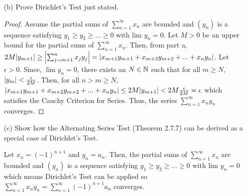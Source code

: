 \documentclass[12pt,letterpaper]{article}
\begin{document}
\begin{itemize}[leftmargin=!,labelindent=5pt]
\begin{itemize}
\begin{proof}
\begin{align*}
                        \abs{\sum_{j={m+1}}^n x_jy_j} &= \abs{s_ny_{n+1} - s_my_{m+1} + \sum_{j=m+1}^n s_j(y_j - y_{j+1})}\\
                        &\leq \abs{s_ny_{n+1} - s_my_{m+1}} + \abs{\sum_{j=m+1}^n s_j(y_j - y_{j+1})}\\
                        &\leq s_ny_{n+1} + s_my_{m+1} + \sum_{j=m+1}^n s_j(y_j - y_{j+1})\\
                        &\leq My_{n+1} + My_{m+1} + \sum_{j=m+1}^n M(y_j - y_{j+1})\\
                        &\leq My_{n+1} + My_{m+1} + M(y_{m+1} - y_{n+1})\\
                        &= 2My_{m+1}
                    \end{align*}
                    So, $\abs{\sum_{j=m+1}^{n} x_j y_j} \leq 2M \abs{y_{m+1}}$ as desired.
                \end{proof}
            \item [(b)] Prove Dirichlet’s Test just stated.
                \begin{proof}
                    Assume the partial sums of $\sum_{n=1}^{\infty} x_n$ are bounded and $(y_n)$ is a sequence satisfying $y_1 \geq y_2 \geq ... \geq 0$ with lim $y_n = 0$.
                    Let $M > 0$ be an upper bound for the partial sums of $\sum_{n=1}^{\infty}x_n$.
                    Then, from part a, $2M \abs{y_{m+1}} \geq \abs{\sum_{j=m+1}^{n} x_j y_j} = \abs{x_{m+1} y_{m+1} + x_{m+2} y_{m+2} + ... + x_{n} y_{n}}$.
                    Let $\epsilon > 0$.
                    Since, $\lim y_n = 0$, there exists an $N \in \mathbb{N}$ such that for all $m \geq N$, $\abs{y_m} < \frac{\epsilon}{2M}$.
                    Then, for all $n > m \geq N$, $\abs{x_{m+1} y_{m+1} + x_{m+2} y_{m+2} + ... + x_{n} y_{n}} \leq 2M \abs{y_{m+1}} < 2M \frac{\epsilon}{2M} = \epsilon$ which satisfies the Cauchy Criterion for Series.
                    Thus, the series $\sum_{n=1}^{\infty} x_n y_n$ converges.
                \end{proof}
            \item [(c)] Show how the Alternating Series Test (Theorem 2.7.7) can be derived as a special case of Dirichlet’s Test.
                
                Let $x_n = (-1)^{n+1}$ and $y_n = a_n$.
                Then, the partial sums of $\sum_{n=1}^{\infty} x_n$ are bounded and $(y_n)$ is a sequence satisfying $y_1 \geq y_2 \geq ... \geq 0$ with lim $y_n = 0$ which means Dirichlet's Test can be applied so $\sum_{n=1}^{\infty} x_n y_n = \sum_{n=1}^{\infty} (-1)^{n+1} a_n$ converges.
        \end{itemize}
\end{itemize}
\end{document}
